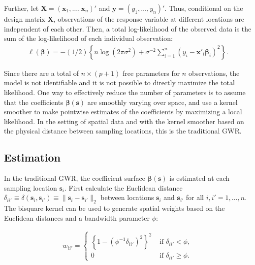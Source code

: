 \documentclass[authoryear, review, 11pt]{elsarticle}
\begin{document}
	Further, let $\bm{X} = \left( \bm{x}_1, \dots, \bm{x}_n \right)'$ and $\bm{y} = \left( y_1, \dots, y_n \right)'$. Thus, conditional on the design matrix $\bm{X}$, observations of the response variable at different locations are independent of each other. Then, a total log-likelihood of the observed data is the sum of the log-likelihood of each individual observation:
	 \begin{align}
	 	\ell\left( \bm{\beta} \right) = - \left(1/2\right) \left\{ n \log \left( 2 \pi \sigma^2\right) +  \sigma^{-2}  \sum_{i=1}^n \left(y_i - \bm{x}'_i\bm{\beta}_i \right)^2  \right\}.
	\end{align}
	
	Since there are a total of $n \times (p+1)$ free parameters for $n$ observations, the model is not identifiable and it is not possible to directly maximize the total likelihood. One way to effectively reduce the number of parameters is to assume that the coefficients $\bm{\beta}(\bm{s})$ are smoothly varying over space, and use a kernel smoother to make pointwise estimates of the coefficients by maximizing a local likelihood. In the setting of spatial data and with the kernel smoother based on the physical distance between sampling locations, this is the traditional GWR.
		
	\subsection{Estimation}		
	In the traditional GWR, the coefficient surface $\bm{\beta}(\bm{s})$ is estimated at each sampling location $\bm{s}_i$. First calculate the Euclidean distance $\delta_{ii'} \equiv \delta\left(\bm{s}_i, \bm{s}_{i'}\right) \equiv \|\bm{s}_i  -\bm{s}_{i'}\|_2$ between locations $\bm{s}_i$ and $\bm{s}_{i'}$ for all $i, i' = 1, \dots, n$. The bisquare kernel can be used to generate spatial weights based on the Euclidean distances and a bandwidth parameter $\phi$:
	
	\begin{align}\label{eq:bisquare}
		w_{ii'} = \begin{cases} \left\{1-\left(\phi^{-1}\delta_{ii'}\right)^2\right\}^2 &\mbox{ if } \delta_{ii'} < \phi, \\ 0 &\mbox{ if } \delta_{ii'} \geq \phi. \end{cases}
	\end{align}
	
\end{document}
